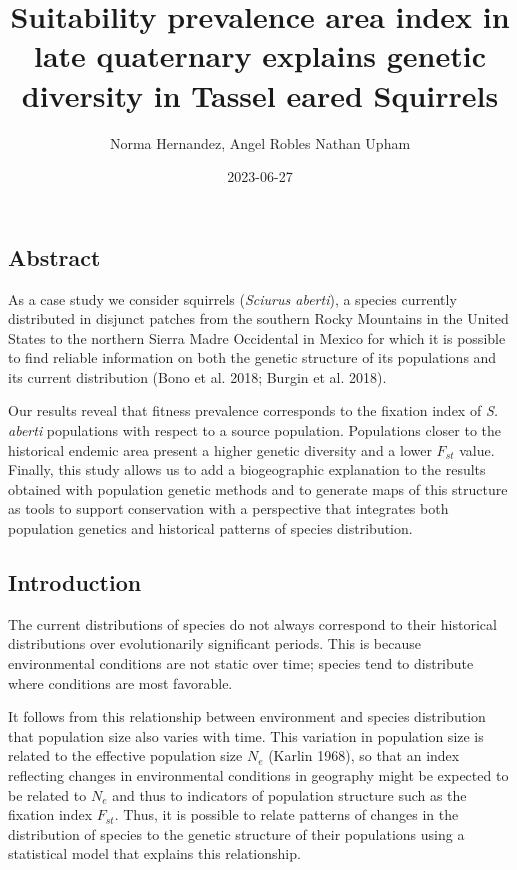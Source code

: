 \documentclass[
]{article}
\title{Suitability prevalence area index in late quaternary explains
genetic diversity in Tassel eared Squirrels}
\author{Norma Hernandez, Angel Robles Nathan Upham}
\date{2023-06-27}
\begin{document}
\maketitle

\hypertarget{abstract}{%
\subsection{Abstract}\label{abstract}}

As a case study we consider squirrels (\emph{Sciurus aberti}), a species
currently distributed in disjunct patches from the southern Rocky
Mountains in the United States to the northern Sierra Madre Occidental
in Mexico for which it is possible to find reliable information on both
the genetic structure of its populations and its current distribution
(Bono et al. 2018; Burgin et al. 2018).

Our results reveal that fitness prevalence corresponds to the fixation
index of \emph{S. aberti} populations with respect to a source
population. Populations closer to the historical endemic area present a
higher genetic diversity and a lower \(F_{st}\) value. Finally, this
study allows us to add a biogeographic explanation to the results
obtained with population genetic methods and to generate maps of this
structure as tools to support conservation with a perspective that
integrates both population genetics and historical patterns of species
distribution.

\hypertarget{introduction}{%
\subsection{Introduction}\label{introduction}}

The current distributions of species do not always correspond to their
historical distributions over evolutionarily significant periods. This
is because environmental conditions are not static over time; species
tend to distribute where conditions are most favorable.

It follows from this relationship between environment and species
distribution that population size also varies with time. This variation
in population size is related to the effective population size \(N_e\)
(Karlin 1968), so that an index reflecting changes in environmental
conditions in geography might be expected to be related to \(N_e\) and
thus to indicators of population structure such as the fixation index
\(F_{st}\). Thus, it is possible to relate patterns of changes in the
distribution of species to the genetic structure of their populations
using a statistical model that explains this relationship.
\end{document}
